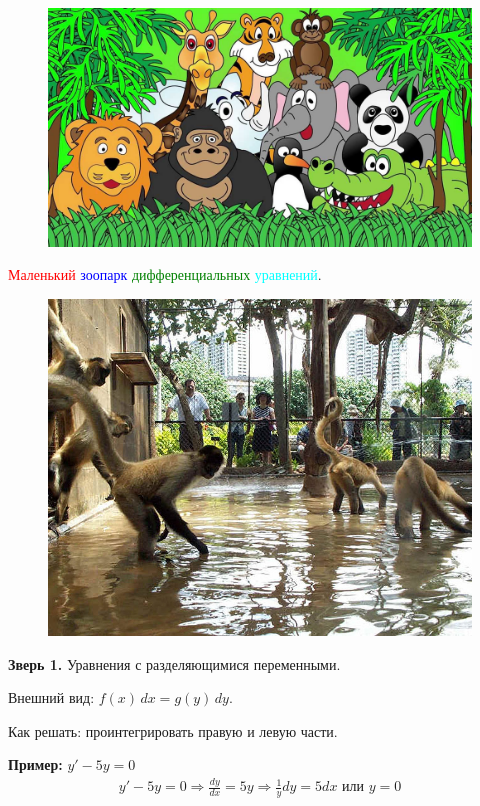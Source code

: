 \documentclass[10pt,a4paper]{article}
\begin{document}
\pagecolor{Tan}
\begin{figure}[h]
\centerline{\includegraphics[width=14cm]{all.jpg}}
\end{figure}
\centerline{\large{\textcolor{red}{Маленький} \textcolor{blue}{зоопарк} \textcolor{green}{дифференциальных} \textcolor{cyan}{уравнений}.}} 
\newpage
\pagecolor{cyan}
{\begin{figure}[h]
\centerline{\includegraphics[width=12cm]{monkey.png}}
\end{figure}}
\par \textbf{Зверь 1.} Уравнения с разделяющимися переменными. 
\par Внешний вид: $f(x) \, dx = g(y) \, dy$. 
\par Как решать: проинтегрировать правую и левую части. 
\par \textbf{Пример:} $y' - 5y = 0$
\begin{eqnarray*}
y' - 5y = 0 \Rightarrow \frac{dy}{dx} = 5y \Rightarrow \frac{1}{y}dy = 5 dx  \text{ или } y = 0
\end{eqnarray*}
\end{document}
